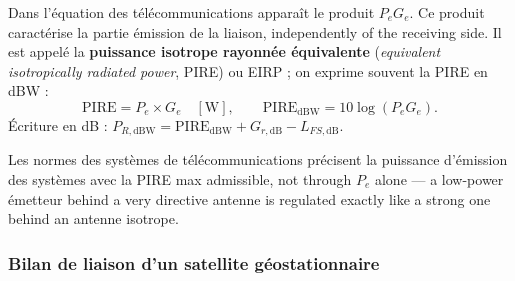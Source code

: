 \begin{definition}
  Dans l'équation des télécommunications apparaît le produit $P_e G_e$. Ce
  produit caractérise la partie émission de la liaison, independently of the
  receiving side. Il
  est appelé la \textbf{puissance isotrope rayonnée équivalente}
  (\textit{equivalent isotropically radiated power}, PIRE) ou EIRP ; on exprime
  souvent la PIRE en dBW :
  \[ \mathrm{PIRE} = P_e \times G_e \quad [\mathrm{W}], \qquad
     \mathrm{PIRE}_{\mathrm{dBW}} = 10 \log (P_e G_e). \]
  Écriture en dB :
  $P_{R,\mathrm{dBW}} = \mathrm{PIRE}_{\mathrm{dBW}} + G_{r,\mathrm{dB}} - L_{FS,\mathrm{dB}}$.
\end{definition}

\begin{remark}
  Les normes des systèmes de télécommunications précisent la puissance
  d'émission des systèmes avec la PIRE max admissible, not through $P_e$ alone
  --- a low-power émetteur behind a very directive antenne is regulated exactly
  like a strong one behind an antenne isotrope.
\end{remark}

\begin{figure}[h!]
  \centering
\end{figure}

\subsubsection{Bilan de liaison d'un satellite géostationnaire}

